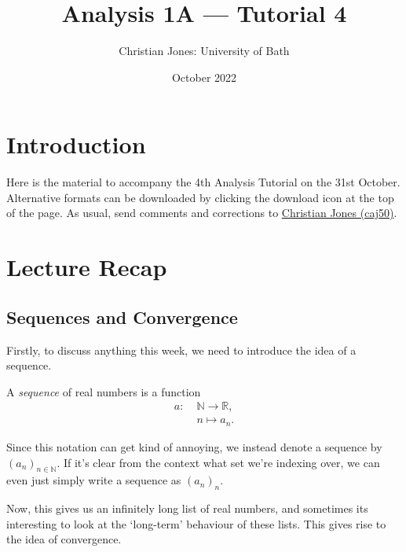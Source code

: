\documentclass[
  10pt,
  a4paper]{article}
\title{Analysis 1A --- Tutorial 4}
\author{Christian Jones: University of Bath}
\date{October 2022}
\theoremstyle{plain}
\theoremstyle{definition}
\theoremstyle{plain}
\theoremstyle{plain}
\theoremstyle{plain}
\theoremstyle{plain}
\theoremstyle{definition}
\theoremstyle{definition}
\theoremstyle{remark}
\theoremstyle{remark}
\let\BeginKnitrBlock\begin \let\EndKnitrBlock\end
\begin{document}
\maketitle

{
\setcounter{tocdepth}{2}
\tableofcontents
}
\newpage
{}

\hypertarget{introduction}{%
\section*{Introduction}\label{introduction}}

Here is the material to accompany the 4th Analysis Tutorial on the 31st October. Alternative formats can be downloaded by clicking the download icon at the top of the page. As usual, send comments and corrections to \href{mailto:caj50@bath.ac.uk}{Christian Jones (caj50)}.

\hypertarget{lecture-recap}{%
\section{Lecture Recap}\label{lecture-recap}}

\hypertarget{sequences-and-convergence}{%
\subsection{Sequences and Convergence}\label{sequences-and-convergence}}

Firstly, to discuss anything this week, we need to introduce the idea of a sequence.
\BeginKnitrBlock{definition}[Sequence]
{\label{def:def1} }A \emph{sequence} of real numbers is a function
\begin{align*}
    a:\; &\mathbb{N} \longrightarrow \mathbb{R},\\
    &n \longmapsto a_n.
\end{align*}
\EndKnitrBlock{definition}
Since this notation can get kind of annoying, we instead denote a sequence by \((a_n)_{n\in\mathbb{N}}\). If it's clear from the context what set we're indexing over, we can even just simply write a sequence as \((a_n)_n\).

Now, this gives us an infinitely long list of real numbers, and sometimes its interesting to look at the `long-term' behaviour of these lists. This gives rise to the idea of convergence.
\end{document}
